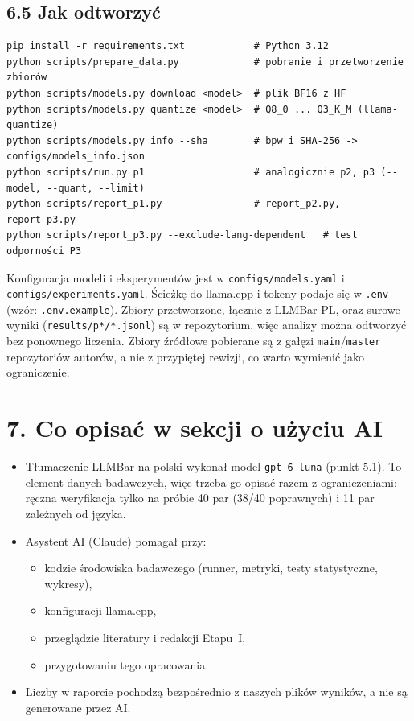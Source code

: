 \documentclass[10pt,a4paper]{article}
\begin{document}
\subsection*{6.5 Jak odtworzyć}
\begin{verbatim}
pip install -r requirements.txt            # Python 3.12
python scripts/prepare_data.py             # pobranie i przetworzenie zbiorów
python scripts/models.py download <model>  # plik BF16 z HF
python scripts/models.py quantize <model>  # Q8_0 ... Q3_K_M (llama-quantize)
python scripts/models.py info --sha        # bpw i SHA-256 -> configs/models_info.json
python scripts/run.py p1                   # analogicznie p2, p3 (--model, --quant, --limit)
python scripts/report_p1.py                # report_p2.py, report_p3.py
python scripts/report_p3.py --exclude-lang-dependent   # test odporności P3
\end{verbatim}
Konfiguracja modeli i eksperymentów jest w \texttt{configs/models.yaml} i \texttt{configs/experiments.yaml}. Ścieżkę do llama.cpp i tokeny podaje się w \texttt{.env} (wzór: \texttt{.env.example}). Zbiory przetworzone, łącznie z LLMBar-PL, oraz surowe wyniki (\texttt{results/p*/*.jsonl}) są w repozytorium, więc analizy można odtworzyć bez ponownego liczenia. Zbiory źródłowe pobierane są z gałęzi \texttt{main}/\texttt{master} repozytoriów autorów, a nie z przypiętej rewizji, co warto wymienić jako ograniczenie.

\section*{7. Co opisać w sekcji o użyciu AI}
\begin{itemize}
  \item Tłumaczenie LLMBar na polski wykonał model \texttt{gpt-6-luna} (punkt 5.1). To element danych badawczych, więc trzeba go opisać razem z ograniczeniami: ręczna weryfikacja tylko na próbie 40 par (38/40 poprawnych) i 11 par zależnych od języka.
  \item Asystent AI (Claude) pomagał przy:
    \begin{itemize}
      \item kodzie środowiska badawczego (runner, metryki, testy statystyczne, wykresy),
      \item konfiguracji llama.cpp,
      \item przeglądzie literatury i redakcji Etapu~I,
      \item przygotowaniu tego opracowania.
    \end{itemize}
  \item Liczby w raporcie pochodzą bezpośrednio z naszych plików wyników, a nie są generowane przez AI.
\end{itemize}
\end{document}
